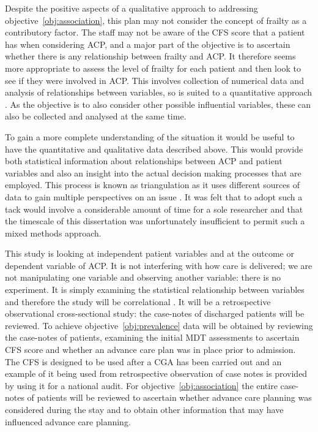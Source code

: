 \documentclass
[
	12pt,
	a4paper,
	oneside,
]{report}
\begin{document}
Despite the positive aspects of a qualitative approach to addressing 
objective~\ref{obj:association}, this plan may not consider the concept of 
frailty
as a contributory factor. The staff may not be aware of the CFS score
that a patient has when considering ACP, and a major part of the objective
is to ascertain whether there is any relationship between frailty and ACP.
It therefore seems more appropriate to assess the level of frailty for each
patient and then look to see if they were involved in ACP. This involves
collection of numerical data and analysis of relationships between variables, 
so is suited to a quantitative approach \parencite{parahoo:14}. As the objective
is to also consider other possible influential variables, these can also
be collected and analysed at the same time.

To gain a more complete understanding of the situation it would be useful to 
have the quantitative and qualitative data described above. This would provide
both statistical information about relationships between ACP and patient
variables and also an insight into the actual decision making processes
that are employed. This process is known as triangulation as it uses different
sources of data to gain multiple perspectives on an issue 
\parencite{biggam:15}. It was felt that to adopt such a tack would involve a 
considerable amount of time for a sole researcher and that the timescale of 
this dissertation was unfortunately insufficient to permit such a mixed 
methods approach.

This study is looking at independent patient variables and at the outcome or
dependent variable 
of ACP. It is not interfering with how care is delivered; we are not 
manipulating one
variable and observing another variable: there is no experiment.
It is simply examining the statistical relationship between variables and
therefore the 
study will be correlational \parencite{field:09}. It will be a retrospective 
observational 
cross-sectional study: the case-notes of discharged patients will be reviewed.
To achieve objective~\ref{obj:prevalence} data will be obtained by reviewing 
the case-notes of patients, examining the initial MDT assessments to ascertain 
CFS score and whether an advance care plan was in place prior to admission. The
CFS is designed to be used after a CGA has been carried out \parencite{bgs:14}
and an example of it being used from retrospective observation of case notes is
provided by \textcite{subbe:13} using it for a national audit.
For objective~\ref{obj:association} the entire case-notes of patients 
will be reviewed to ascertain whether advance care planning was considered 
during the stay and to obtain other information that may have influenced
advance care planning.
\end{document}
